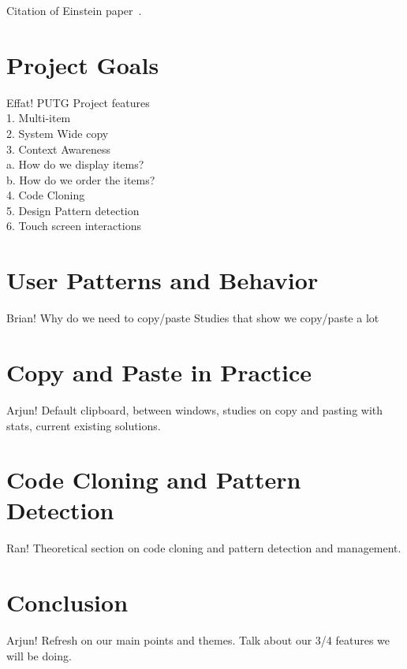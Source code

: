 \documentclass{acm_proc_article-sp}
\begin{document}
Citation of Einstein paper~\cite{Einstein}.

\section{Project Goals}
Effat!
PUTG
Project features
\\
1. Multi-item\\
2. System Wide copy\\
3. Context Awareness\\
    a. How do we display items?\\
    b. How do we order the items?\\
4. Code Cloning   \\
5. Design Pattern detection\\ 
6. Touch screen interactions\\

\section{User Patterns and Behavior}
Brian!
Why do we need to copy/paste
Studies that show we copy/paste a lot

\section{Copy and Paste in Practice}
Arjun!
Default clipboard, between windows, studies on copy and pasting with stats, current existing solutions.

\section{Code Cloning and Pattern Detection}
Ran!
Theoretical section on code cloning and pattern detection and management.

\section{Conclusion}
Arjun!
Refresh on our main points and themes. Talk about our 3/4 features we will be doing.




\end{document}
